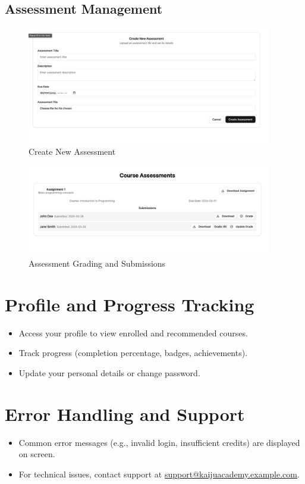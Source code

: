 \documentclass[a4paper,11pt]{scrartcl}
\begin{document}
\subsection{Assessment Management}
\begin{figure}[H]
    \centering
    \includegraphics[width=0.95\textwidth]{TeacherCreateAssessment.jpg}
    \caption{Create New Assessment}
\end{figure}
\begin{figure}[H]
    \centering
    \includegraphics[width=0.95\textwidth]{TeacherAssessment.jpg}
    \caption{Assessment Grading and Submissions}
\end{figure}

\section{Profile and Progress Tracking}
\begin{itemize}[leftmargin=*]
    \item Access your profile to view enrolled and recommended courses.
    \item Track progress (completion percentage, badges, achievements).
    \item Update your personal details or change password.
\end{itemize}

\section{Error Handling and Support}
\begin{itemize}[leftmargin=*]
    \item Common error messages (e.g., invalid login, insufficient credits) are displayed on screen.
    \item For technical issues, contact support at \href{mailto:support@kaijuacademy.example.com}{support@kaijuacademy.example.com}.
\end{itemize}
\end{document}
